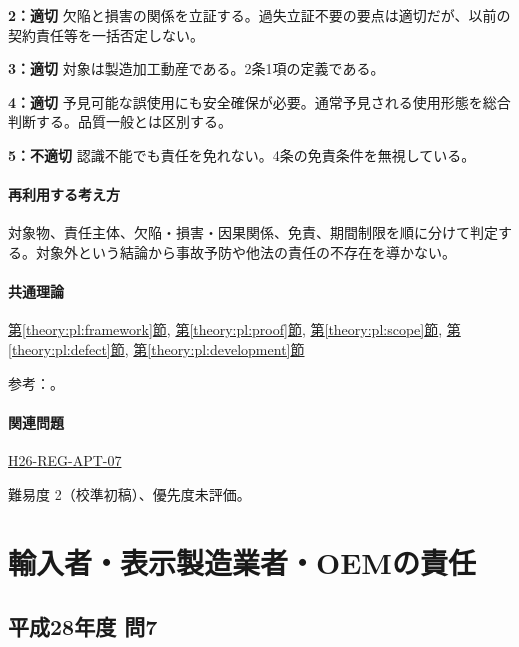 \noindent\textbf{2：適切} 欠陥と損害の関係を立証する。過失立証不要の要点は適切だが、以前の契約責任等を一括否定しない。\par

\noindent\textbf{3：適切} 対象は製造加工動産である。2条1項の定義である。\par

\noindent\textbf{4：適切} 予見可能な誤使用にも安全確保が必要。通常予見される使用形態を総合判断する。品質一般とは区別する。\par

\noindent\textbf{5：不適切} 認識不能でも責任を免れない。4条の免責条件を無視している。\par

\paragraph{再利用する考え方} 対象物、責任主体、欠陥・損害・因果関係、免責、期間制限を順に分けて判定する。対象外という結論から事故予防や他法の責任の不存在を導かない。

\paragraph{共通理論} \hyperref[theory:pl:framework]{第\ref*{theory:pl:framework}節}, \hyperref[theory:pl:proof]{第\ref*{theory:pl:proof}節}, \hyperref[theory:pl:scope]{第\ref*{theory:pl:scope}節}, \hyperref[theory:pl:defect]{第\ref*{theory:pl:defect}節}, \hyperref[theory:pl:development]{第\ref*{theory:pl:development}節}

\par 参考：\cite{pl_statute,pl_qa,pl_definitions2018}。

\paragraph{関連問題} \hyperref[q:h26-reg-apt-07]{H26-REG-APT-07}

\par 難易度 2（校準初稿）、優先度未評価。

\section{輸入者・表示製造業者・OEMの責任}

\subsection{平成28年度 問7}
\label{q:h28-reg-apt-07}

